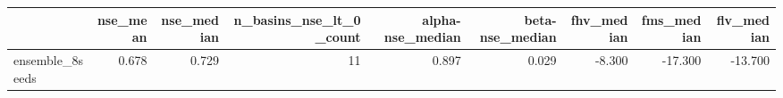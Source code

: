 \begin{tabular}{lrrrrrrrr}
\toprule
 & nse_mean & nse_median & n_basins_nse_lt_0_count & alpha-nse_median & beta-nse_median & fhv_median & fms_median & flv_median \\
\midrule
ensemble_8seeds & 0.678 & 0.729 & 11 & 0.897 & 0.029 & -8.300 & -17.300 & -13.700 \\
\bottomrule
\end{tabular}
